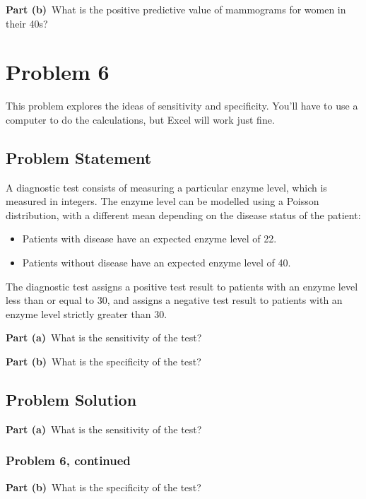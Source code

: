 \documentclass[12pt]{article}
\theoremstyle{definition}
\begin{document}
\vspace{1.5in}
\noindent
{\bf Part (b)}\ What is the positive predictive value of mammograms for women in their 40s?



\newpage
\section*{Problem 6}

This problem explores the ideas of sensitivity and specificity. You'll have to use a computer to do the calculations, but Excel will work just fine.

\subsection*{Problem Statement}

A diagnostic test consists of measuring a particular enzyme level, which is measured in integers. The enzyme level can be modelled using a Poisson distribution, with a different mean depending on the disease status of the patient:
\begin{itemize}
	\item Patients with disease have an expected enzyme level of 22.
	\item Patients without disease have an expected enzyme level of 40.
\end{itemize}
The diagnostic test assigns a positive test result to patients with an enzyme level less than or equal to 30, and assigns a negative test result to patients with an enzyme level strictly greater than 30.

\bigskip
\noindent
{\bf Part (a)}\ What is the sensitivity of the test?

\bigskip
\noindent
{\bf Part (b)}\ What is the specificity of the test?


\subsection*{Problem Solution}

\noindent
{\bf Part (a)}\ What is the sensitivity of the test?


\newpage
\subsubsection*{Problem 6, continued}

\vspace{1.5in}
\noindent
{\bf Part (b)}\ What is the specificity of the test?
\end{document}

